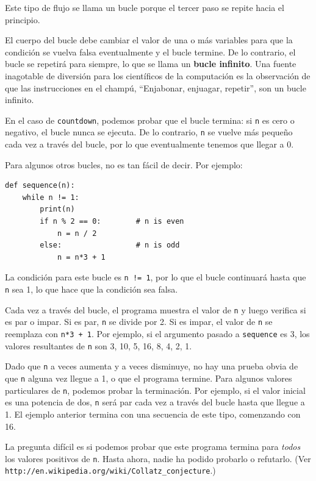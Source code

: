 Este tipo de flujo se llama un bucle porque el tercer paso se repite hacia el principio.

El cuerpo del bucle debe cambiar el valor de una o más variables para que la condición se vuelva falsa eventualmente y el bucle termine. De lo contrario, el bucle se repetirá para siempre, lo que se llama un \textbf{bucle infinito}. Una fuente inagotable de diversión para los científicos de la computación es la observación de que las instrucciones en el champú, ``Enjabonar, enjuagar, repetir'', son un bucle infinito.

En el caso de \texttt{countdown}, podemos probar que el bucle termina: si \texttt{n} es cero o negativo, el bucle nunca se ejecuta. De lo contrario, \texttt{n} se vuelve más pequeño cada vez a través del bucle, por lo que eventualmente tenemos que llegar a 0.

Para algunos otros bucles, no es tan fácil de decir. Por ejemplo:

\begin{lstlisting}
def sequence(n):
    while n != 1:
        print(n)
        if n % 2 == 0:        # n is even
            n = n / 2
        else:                 # n is odd
            n = n*3 + 1
\end{lstlisting}

La condición para este bucle es \texttt{n != 1}, por lo que el bucle continuará hasta que \texttt{n} sea 1, lo que hace que la condición sea falsa.

Cada vez a través del bucle, el programa muestra el valor de \texttt{n} y luego verifica si es par o impar. Si es par, \texttt{n} se divide por 2. Si es impar, el valor de \texttt{n} se reemplaza con \texttt{n*3 + 1}. Por ejemplo, si el argumento pasado a \texttt{sequence} es 3, los valores resultantes de \texttt{n} son 3, 10, 5, 16, 8, 4, 2, 1.

Dado que \texttt{n} a veces aumenta y a veces disminuye, no hay una prueba obvia de que \texttt{n} alguna vez llegue a 1, o que el programa termine. Para algunos valores particulares de \texttt{n}, podemos probar la terminación. Por ejemplo, si el valor inicial es una potencia de dos, \texttt{n} será par cada vez a través del bucle hasta que llegue a 1. El ejemplo anterior termina con una secuencia de este tipo, comenzando con 16.

La pregunta difícil es si podemos probar que este programa termina para \emph{todos} los valores positivos de \texttt{n}. Hasta ahora, nadie ha podido probarlo o refutarlo. (Ver \texttt{http://en.wikipedia.org/wiki/Collatz\_conjecture}.)

